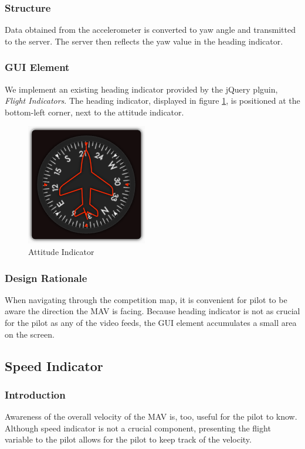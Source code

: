 \documentclass[onecolumn, oneside, letterpaper, draftclsnofoot, 10pt, compsoc]{IEEEtran}
\begin{document}
\subsubsection{Structure}
Data obtained from the accelerometer is converted to yaw angle and transmitted to the server. The server then reflects the yaw value in the heading indicator.

\subsubsection{GUI Element}
We implement an existing heading indicator provided by the jQuery plguin, \textit{Flight Indicators}. The heading indicator, displayed in figure \ref{fig:heading}, is positioned at the bottom-left corner, next to the attitude indicator.

\begin{figure}[h]
    \centering
    \includegraphics{graphics/heading.png}
    \caption{Attitude Indicator}
    \label{fig:heading}
\end{figure}

\subsubsection{Design Rationale}
When navigating through the competition map, it is convenient for pilot to be aware the direction the MAV is facing. Because heading indicator is not as crucial for the pilot as any of the video feeds, the GUI element accumulates a small area on the screen.

\subsection{Speed Indicator}
\subsubsection{Introduction}
Awareness of the overall velocity of the MAV is, too, useful for the pilot to know. Although speed indicator is not a crucial component, presenting the flight variable to the pilot allows for the pilot to keep track of the velocity.
\end{document}
